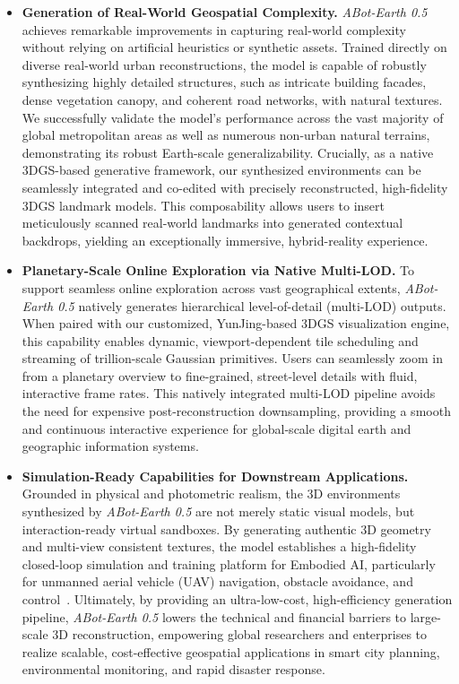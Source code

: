 \documentclass{llmxive}
\providecommand{\method}{\textit{ABot-Earth 0.5}\xspace}
\begin{document}
\begin{itemize}
    \item \textbf{Generation of Real-World Geospatial Complexity.} \method{} achieves remarkable improvements in capturing real-world complexity without relying on artificial heuristics or synthetic assets. Trained directly on diverse real-world urban reconstructions, the model is capable of robustly synthesizing highly detailed structures, such as intricate building facades, dense vegetation canopy, and coherent road networks, with natural textures. We successfully validate the model's performance across the vast majority of global metropolitan areas as well as numerous non-urban natural terrains, demonstrating its robust Earth-scale generalizability. Crucially, as a native 3DGS-based generative framework, our synthesized environments can be seamlessly integrated and co-edited with precisely reconstructed, high-fidelity 3DGS landmark models. This composability allows users to insert meticulously scanned real-world landmarks into generated contextual backdrops, yielding an exceptionally immersive, hybrid-reality experience.
    
    \item \textbf{Planetary-Scale Online Exploration via Native Multi-LOD.} To support seamless online exploration across vast geographical extents, \method{} natively generates hierarchical level-of-detail (multi-LOD) outputs. When paired with our customized, YunJing-based 3DGS visualization engine, this capability enables dynamic, viewport-dependent tile scheduling and streaming of trillion-scale Gaussian primitives. Users can seamlessly zoom in from a planetary overview to fine-grained, street-level details with fluid, interactive frame rates. This natively integrated multi-LOD pipeline avoids the need for expensive post-reconstruction downsampling, providing a smooth and continuous interactive experience for global-scale digital earth and geographic information systems.
    
    \item \textbf{Simulation-Ready Capabilities for Downstream Applications.} Grounded in physical and photometric realism, the 3D environments synthesized by \method{} are not merely static visual models, but interaction-ready virtual sandboxes. By generating authentic 3D geometry and multi-view consistent textures, the model establishes a high-fidelity closed-loop simulation and training platform for Embodied AI, particularly for unmanned aerial vehicle (UAV) navigation, obstacle avoidance, and control~\cite{AirSim,FlightGoggles}. Ultimately, by providing an ultra-low-cost, high-efficiency generation pipeline, \method{} lowers the technical and financial barriers to large-scale 3D reconstruction, empowering global researchers and enterprises to realize scalable, cost-effective geospatial applications in smart city planning, environmental monitoring, and rapid disaster response.
\end{itemize}
\end{document}
